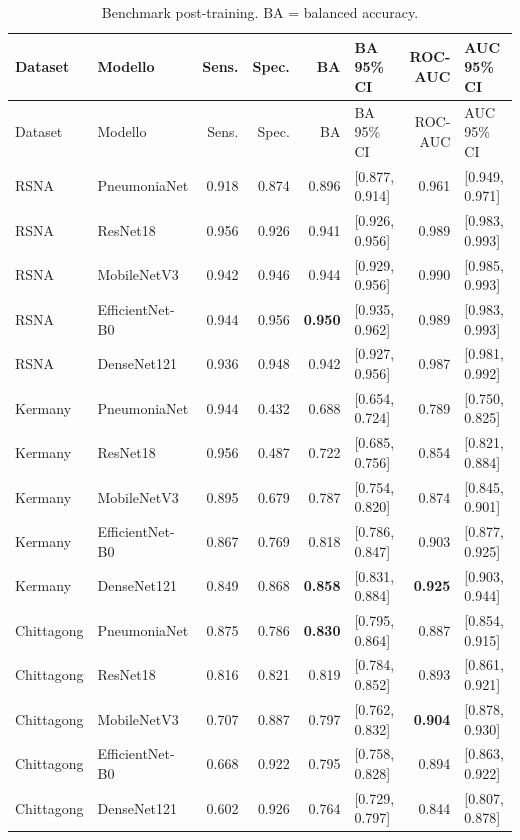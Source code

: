 \documentclass[11pt,a4paper]{article}
\newcommand{\auc}{ROC-AUC}
\begin{document}
\small
\begin{longtable}{llrrrlrl}
\caption{Benchmark post-training. BA = balanced accuracy.}\label{tab:benchmark-post-training}\\
\toprule
Dataset & Modello & Sens. & Spec. & BA & BA 95\% CI & \auc & AUC 95\% CI \\
\midrule
\endfirsthead
\toprule
Dataset & Modello & Sens. & Spec. & BA & BA 95\% CI & \auc & AUC 95\% CI \\
\midrule
\endhead
RSNA & PneumoniaNet & 0.918 & 0.874 & 0.896 & [0.877, 0.914] & 0.961 & [0.949, 0.971] \\
RSNA & ResNet18 & 0.956 & 0.926 & 0.941 & [0.926, 0.956] & 0.989 & [0.983, 0.993] \\
RSNA & MobileNetV3 & 0.942 & 0.946 & 0.944 & [0.929, 0.956] & 0.990 & [0.985, 0.993] \\
RSNA & EfficientNet-B0 & 0.944 & 0.956 & \textbf{0.950} & [0.935, 0.962] & 0.989 & [0.983, 0.993] \\
RSNA & DenseNet121 & 0.936 & 0.948 & 0.942 & [0.927, 0.956] & 0.987 & [0.981, 0.992] \\
\midrule
Kermany & PneumoniaNet & 0.944 & 0.432 & 0.688 & [0.654, 0.724] & 0.789 & [0.750, 0.825] \\
Kermany & ResNet18 & 0.956 & 0.487 & 0.722 & [0.685, 0.756] & 0.854 & [0.821, 0.884] \\
Kermany & MobileNetV3 & 0.895 & 0.679 & 0.787 & [0.754, 0.820] & 0.874 & [0.845, 0.901] \\
Kermany & EfficientNet-B0 & 0.867 & 0.769 & 0.818 & [0.786, 0.847] & 0.903 & [0.877, 0.925] \\
Kermany & DenseNet121 & 0.849 & 0.868 & \textbf{0.858} & [0.831, 0.884] & \textbf{0.925} & [0.903, 0.944] \\
\midrule
Chittagong & PneumoniaNet & 0.875 & 0.786 & \textbf{0.830} & [0.795, 0.864] & 0.887 & [0.854, 0.915] \\
Chittagong & ResNet18 & 0.816 & 0.821 & 0.819 & [0.784, 0.852] & 0.893 & [0.861, 0.921] \\
Chittagong & MobileNetV3 & 0.707 & 0.887 & 0.797 & [0.762, 0.832] & \textbf{0.904} & [0.878, 0.930] \\
Chittagong & EfficientNet-B0 & 0.668 & 0.922 & 0.795 & [0.758, 0.828] & 0.894 & [0.863, 0.922] \\
Chittagong & DenseNet121 & 0.602 & 0.926 & 0.764 & [0.729, 0.797] & 0.844 & [0.807, 0.878] \\
\bottomrule
\end{longtable}
\normalsize
\end{document}
